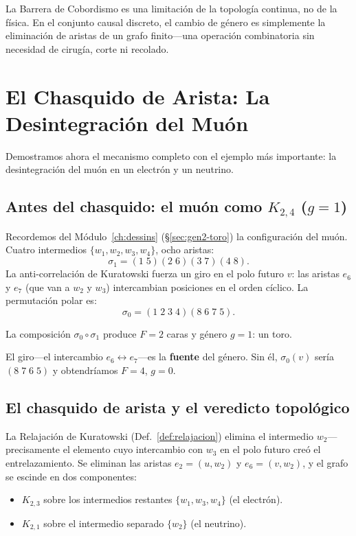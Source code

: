 \documentclass[11pt, a4paper, openany]{book}
\begin{document}
\begin{result}[title={El cobordismo es un artefacto del continuo}]
La Barrera de Cobordismo es una limitación de la topología continua, no
de la física. En el conjunto causal discreto, el cambio de género es
simplemente la eliminación de aristas de un grafo finito---una
operación combinatoria sin necesidad de cirugía, corte ni recolado.
\end{result}

\section{El Chasquido de Arista: La Desintegración del Muón}
\label{sec:chasquido}

Demostramos ahora el mecanismo completo con el ejemplo más importante:
la desintegración del muón en un electrón y un neutrino.

\subsection{Antes del chasquido: el muón como $K_{2,4}$ ($g = 1$)}

Recordemos del Módulo~\ref{ch:dessins} (\S\ref{sec:gen2-toro}) la
configuración del muón. Cuatro intermedios $\{w_1, w_2, w_3, w_4\}$,
ocho aristas:
\[
  \sigma_1 = (1\;5)(2\;6)(3\;7)(4\;8).
\]
La anti-correlación de Kuratowski fuerza un giro en el polo futuro $v$:
las aristas $e_6$ y $e_7$ (que van a $w_2$ y $w_3$) intercambian
posiciones en el orden cíclico. La permutación polar es:
\[
  \sigma_0 = (1\;2\;3\;4)(8\;6\;7\;5).
\]

La composición $\sigma_0 \circ \sigma_1$ produce $F = 2$ caras y género
$g = 1$: un toro.

El giro---el intercambio $e_6 \leftrightarrow e_7$---es la
\textbf{fuente} del género. Sin él, $\sigma_0(v)$ sería
$(8\;7\;6\;5)$ y obtendríamos $F = 4$, $g = 0$.

\subsection{El chasquido de arista y el veredicto topol\'ogico}
\label{subsec:edge-snap}

La Relajaci\'on de Kuratowski (Def.~\ref{def:relajacion}) elimina el
intermedio $w_2$---precisamente el elemento cuyo intercambio con $w_3$
en el polo futuro cre\'o el entrelazamiento. Se eliminan las aristas
$e_2 = (u, w_2)$ y $e_6 = (v, w_2)$, y el grafo se escinde en dos
componentes:
\begin{itemize}
  \item $K_{2,3}$ sobre los intermedios restantes $\{w_1, w_3, w_4\}$
        (el electr\'on).
  \item $K_{2,1}$ sobre el intermedio separado $\{w_2\}$ (el neutrino).
\end{itemize}
\end{document}
